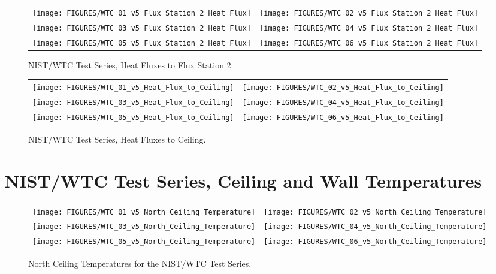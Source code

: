 \begin{figure}[h]
\begin{tabular*}{\textwidth}{l@{\extracolsep{\fill}}r}
\texttt{[image: FIGURES/WTC\_01\_v5\_Flux\_Station\_2\_Heat\_Flux]} &
\texttt{[image: FIGURES/WTC\_02\_v5\_Flux\_Station\_2\_Heat\_Flux]} \\
\texttt{[image: FIGURES/WTC\_03\_v5\_Flux\_Station\_2\_Heat\_Flux]} &
\texttt{[image: FIGURES/WTC\_04\_v5\_Flux\_Station\_2\_Heat\_Flux]} \\
\texttt{[image: FIGURES/WTC\_05\_v5\_Flux\_Station\_2\_Heat\_Flux]} &
\texttt{[image: FIGURES/WTC\_06\_v5\_Flux\_Station\_2\_Heat\_Flux]}
\end{tabular*}
\caption{NIST/WTC Test Series, Heat Fluxes to Flux Station 2.}
\label{NIST_WTC_Flux_Station_2_Heat_Flux}
\end{figure}

\begin{figure}[h]
\begin{tabular*}{\textwidth}{l@{\extracolsep{\fill}}r}
\texttt{[image: FIGURES/WTC\_01\_v5\_Heat\_Flux\_to\_Ceiling]} &
\texttt{[image: FIGURES/WTC\_02\_v5\_Heat\_Flux\_to\_Ceiling]} \\
\texttt{[image: FIGURES/WTC\_03\_v5\_Heat\_Flux\_to\_Ceiling]} &
\texttt{[image: FIGURES/WTC\_04\_v5\_Heat\_Flux\_to\_Ceiling]} \\
\texttt{[image: FIGURES/WTC\_05\_v5\_Heat\_Flux\_to\_Ceiling]} &
\texttt{[image: FIGURES/WTC\_06\_v5\_Heat\_Flux\_to\_Ceiling]}
\end{tabular*}
\caption{NIST/WTC Test Series, Heat Fluxes to Ceiling.}
\label{NIST_WTC_Flux_Heat_Flux_to_Ceiling}
\end{figure}


\clearpage


\section{NIST/WTC Test Series, Ceiling and Wall Temperatures}


\begin{figure}[h!]
\begin{tabular*}{\textwidth}{l@{\extracolsep{\fill}}r}
\texttt{[image: FIGURES/WTC\_01\_v5\_North\_Ceiling\_Temperature]} &
\texttt{[image: FIGURES/WTC\_02\_v5\_North\_Ceiling\_Temperature]} \\
\texttt{[image: FIGURES/WTC\_03\_v5\_North\_Ceiling\_Temperature]} &
\texttt{[image: FIGURES/WTC\_04\_v5\_North\_Ceiling\_Temperature]} \\
\texttt{[image: FIGURES/WTC\_05\_v5\_North\_Ceiling\_Temperature]} &
\texttt{[image: FIGURES/WTC\_06\_v5\_North\_Ceiling\_Temperature]}
\end{tabular*}
\caption{North Ceiling Temperatures for the NIST/WTC Test Series.}
\label{NIST_WTC North_Ceiling_Temp}
\end{figure}


